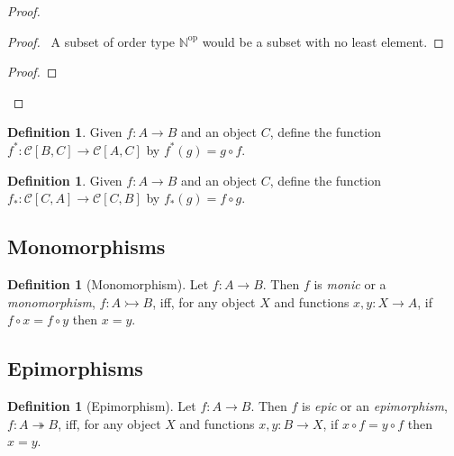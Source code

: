 \documentclass{book}
\let\qed\relax
\theoremstyle{definition}
\newtheorem{df}[ax]{Definition}
\begin{document}
\begin{proof}
\pf
{}
\begin{proof}
	\pf\ A subset of order type $\mathbb{N}^\mathrm{op}$ would be a subset with no least element.
\end{proof}
\begin{proof}
\end{proof}
\qed
\end{proof}

\begin{df}
Given $f : A \rightarrow B$ and an object $C$, define the function $f^* : \mathcal{C}[B,C] \rightarrow \mathcal{C}[A,C]$ by $f^*(g) = g \circ f$.
\end{df}

\begin{df}
Given $f : A \rightarrow B$ and an object $C$, define the function $f_* : \mathcal{C}[C,A] \rightarrow \mathcal{C}[C,B]$ by $f_*(g) = f \circ g$.
\end{df}

\subsection{Monomorphisms}

\begin{df}[Monomorphism]
Let $f : A \rightarrow B$. Then $f$ is \emph{monic} or a \emph{monomorphism}, $f : A \rightarrowtail B$, iff, for any object $X$ and functions $x,y : X \rightarrow A$, if $f \circ x = f \circ y$ then $x = y$.
\end{df}

\subsection{Epimorphisms}

\begin{df}[Epimorphism]
Let $f : A \rightarrow B$. Then $f$ is \emph{epic} or an \emph{epimorphism}, $f : A \twoheadrightarrow B$, iff, for any object $X$ and functions $x,y : B \rightarrow X$, if $x \circ f = y \circ f$ then $x = y$.
\end{df}
\end{document}
